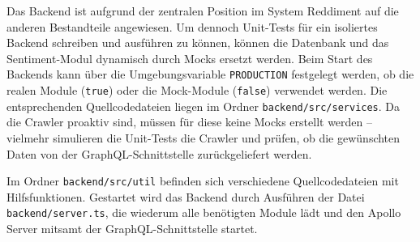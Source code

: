 \documentclass[a4paper, 10pt, conference]{IEEEtran}
\begin{document}
Das Backend ist aufgrund der zentralen Position im System Reddiment auf die anderen Bestandteile angewiesen. Um dennoch Unit-Tests für ein isoliertes Backend schreiben und ausführen zu können, können die Datenbank und das Sentiment-Modul dynamisch durch Mocks ersetzt werden. Beim Start des Backends kann über die Umgebungsvariable \texttt{PRODUCTION} festgelegt werden, ob die realen Module (\texttt{true}) oder die Mock-Module (\texttt{false}) verwendet werden. Die entsprechenden Quellcodedateien liegen im Ordner \texttt{backend/src/services}. Da die Crawler proaktiv sind, müssen für diese keine Mocks erstellt werden -- vielmehr simulieren die Unit-Tests die Crawler und prüfen, ob die gewünschten Daten von der GraphQL-Schnittstelle zurückgeliefert werden.

Im Ordner \texttt{backend/src/util} befinden sich verschiedene Quellcodedateien mit Hilfsfunktionen. Gestartet wird das Backend durch Ausführen der Datei \texttt{backend/server.ts}, die wiederum alle benötigten Module lädt und den Apollo Server mitsamt der GraphQL-Schnittstelle startet.
\end{document}
